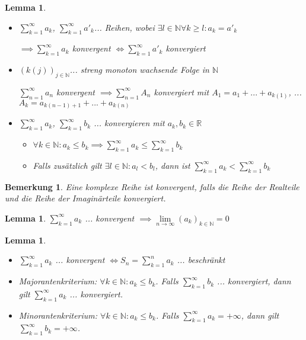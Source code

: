 \documentclass[twocolumn]{article}
\newtheorem{lemma}[theorem]{Lemma}
\newtheorem*{remark}{Bemerkung}
\newcommand*{\logeq}{\Leftrightarrow}
\begin{document}
\begin{lemma}
	\begin{itemize}
		\item $\sum_{k=1}^{\infty}a_k$, $\sum_{k=1}^{\infty}a'_k$... Reihen, wobei $\exists l \in \mathbb{N} \forall k \geq l : a_k = a'_k$
		
		$\implies \sum_{k=1}^{\infty}a_k$ konvergent $\logeq \sum_{k=1}^{\infty}a'_k$ konvergiert
	
		\item $(k(j))_{j \in \mathbb{N}}$... streng monoton wachsende Folge in $\mathbb{N}$
		
		$\sum_{n=1}^{\infty}a_n$ konvergent $\implies \sum_{n=1}^{\infty}A_n$ konvergiert mit $A_1 = a_1+...+a_{k(1)}$, ... $A_k=a_{k(n-1)+1}+...+a_{k(n)}$
		
		\item $\sum_{k=1}^{\infty}a_k$, $\sum_{k=1}^{\infty}b_k$ ... konvergieren mit $a_k,b_k \in \mathbb{R}$
		
		\begin{itemize}
			\item $\forall k \in \mathbb{N} : a_k \leq b_k \implies \sum_{k=1}^{\infty}a_k \leq \sum_{k=1}^{\infty}b_k$
			\item Falls zusätzlich gilt $\exists l \in \mathbb{N} : a_l < b_l$, dann ist $\sum_{k=1}^{\infty}a_k < \sum_{k=1}^{\infty}b_k$
		\end{itemize}
	\end{itemize}
	
\end{lemma}

\begin{remark}
	Eine komplexe Reihe ist konvergent, falls die Reihe der Realteile und die Reihe der Imaginärteile konvergiert.
\end{remark}

\begin{lemma}
	$\sum_{k=1}^{\infty}a_k$ ... konvergent $\implies \lim\limits_{n \rightarrow \infty} (a_k)_{k \in \mathbb{N}} = 0$
\end{lemma}

\begin{lemma}
	\begin{itemize}
		\item $\sum_{k=1}^{\infty}a_k$ ... konvergent $\logeq S_n = \sum_{k=1}^{n}a_k$ ... beschränkt
		\item Majorantenkriterium: $\forall k \in \mathbb{N} : a_k \leq b_k$. Falls $\sum_{k=1}^{\infty}b_k$ ... konvergiert, dann gilt $\sum_{k=1}^{\infty}a_k$ ... konvergiert.
		\item Minorantenkriterium: $\forall k \in \mathbb{N} : a_k \leq b_k$. Falls $\sum_{k=1}^{\infty}a_k = +\infty$, dann gilt $\sum_{k=1}^{\infty}b_k = +\infty$.
	\end{itemize}
\end{lemma}
\end{document}
